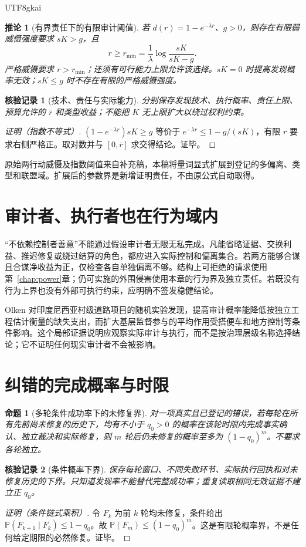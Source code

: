 \documentclass[12pt,a4paper,openany]{report}
\newtheorem{proposition}{命题}[chapter]
\newtheorem{corollary}{推论}[chapter]
\newtheorem{Certificate}{核验记录}[chapter]
\newcommand{\PP}{\mathbb P}
\begin{document}
\begin{CJK*}{UTF8}{gkai}
\begin{corollary}[有界责任下的有限审计阈值]
\label{cor:deterrence-threshold}
若 $d(r)=1-e^{-\lambda r}$、$g>0$，则存在有限弱威慑强度要求 $sK>g$，且
\[
 r\ge r_{\min}=\frac1\lambda\log\frac{sK}{sK-g}.
\]
严格威慑要求 $r>r_{\min}$；还须有可行能力上限允许该选择。$sK=0$ 时提高发现概率无效；$sK\le g$ 时不存在有限的严格威慑强度。
\end{corollary}
\begin{Certificate}[技术、责任与实际能力]
分别保存发现技术、执行概率、责任上限、预算允许的 $\bar r$ 和类型收益；不能把 $K$ 无上限扩大以绕过权利约束。
\end{Certificate}
\begin{proof}[证明（指数不等式）]
$(1-e^{-\lambda r})sK\ge g$ 等价于 $e^{-\lambda r}\le1-g/(sK)$，有限 $r$ 要求右侧严格正。取对数并与 $[0,\bar r]$ 求交得结论。证毕。
\end{proof}
原始两行动威慑及指数阈值来自补充稿\cite{SourceSupplement}，本稿将量词显式扩展到登记的多偏离、类型和联盟域。扩展后的参数界是新增证明责任，不由原公式自动取得。

\section{审计者、执行者也在行为域内}
“不依赖控制者善意”不能通过假设审计者无限无私完成。凡能省略证据、交换利益、推迟修复或绕过结算的角色，都应进入实际控制和偏离集合。若两方能够合谋且合谋净收益为正，仅检查各自单独偏离不够。结构上可拒绝的请求使用第~\ref{chap:power}章；仍可实施的外围侵害使用本章的行为界及独立责任。若既没有行为上界也没有外部可执行约束，应明确不签发稳健结论。

Olken 对印度尼西亚村级道路项目的随机实验发现，提高审计概率能降低按独立工程估计衡量的缺失支出，而扩大基层监督参与的平均作用受搭便车和地方控制等条件影响\cite{Olken2007}。这个局部证据说明应观察实际审计与执行，而不是按治理层级名称选择结论；它不证明任何现实审计者不会被影响。

\section{纠错的完成概率与时限}
\begin{proposition}[多轮条件成功率下的未修复界]
\label{prop:repair-probability}
对一项真实且已登记的错误，若每轮在所有先前尚未修复的历史下，均有不小于 $q_0>0$ 的概率在该轮时限内完成\emph{事实确认、独立裁决和实际修复}，则 $m$ 轮后仍未修复的概率至多为 $(1-q_0)^m$。不要求各轮独立。
\end{proposition}
\begin{Certificate}[条件概率下界]
保存每轮窗口、不同失败环节、实际执行回执和对未修复历史的下界。只知道发现率不能替代完整成功率；重复读取相同无效证据不建立正 $q_0$。
\end{Certificate}
\begin{proof}[证明（条件链式乘积）]
令 $F_k$ 为前 $k$ 轮均未修复，条件给出 $\PP(F_{k+1}\mid F_k)\le1-q_0$。故 $\PP(F_m)\le(1-q_0)^m$。这是有限轮概率界，不是任何给定期限的必然修复。证毕。
\end{proof}


\end{CJK*}
\end{document}
